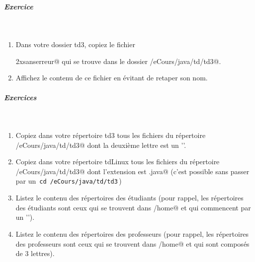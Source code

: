 \documentclass[11pt,a4paper]{article}
\begin{document}
		\subparagraph{Exercice} 
		
					\textcolor{white}{.} \par
				
            \par
        
					\begin{enumerate}
				
			\item 
            Dans votre dossier td3, copiez le fichier \par
				\verb@monfichieraunomtellementlongquilmeparaitpeuprobabledeletaper2xsanserreur@
            qui se trouve dans le dossier \verb@/eCours/java/td/td3@.
          
			\item Affichez le contenu de ce fichier en \'evitant de retaper son nom.
					\end{enumerate}
				
			
		\subparagraph{Exercices} 
		
					\textcolor{white}{.} \par
				
            \par
        
					\begin{enumerate}
				
			\item 
            Copiez dans votre r\'epertoire td3 tous les fichiers du r\'epertoire 
            \verb@/eCours/java/td/td3@ dont la deuxi\`eme lettre est un '\verb@x@'.
          
			\item 
            Copiez dans votre r\'epertoire tdLinux tous les fichiers du r\'epertoire
            \verb@/eCours/java/td/td3@ dont l'extension est \verb@.java@ 
            (c'est possible sans passer par un \,\verb|cd /eCours/java/td/td3|\,)
          
			\item 
            Listez le contenu des r\'epertoires des \'etudiants (pour rappel, les r\'epertoires des \'etudiants sont ceux 
            qui se trouvent dans \verb@/home@ et qui commencent par un '\verb@g@').
          
			\item 
            Listez le contenu des r\'epertoires des professeurs (pour rappel, les  
            r\'epertoires des professeurs sont ceux qui se trouvent dans \verb@/home@ et qui sont compos\'es de 3 lettres).
          
					\end{enumerate}
				
\end{document}
